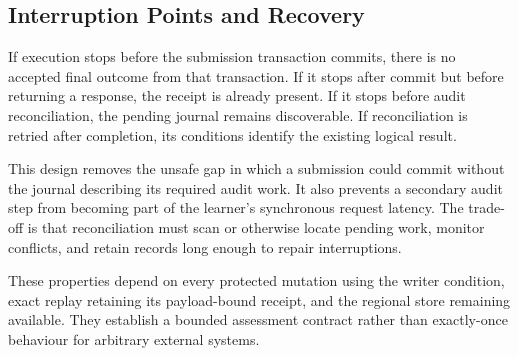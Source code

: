 \subsection{Interruption Points and Recovery}
If execution stops before the submission transaction commits, there is no accepted final outcome from that transaction. If it stops after commit but before returning a response, the receipt is already present. If it stops before audit reconciliation, the pending journal remains discoverable. If reconciliation is retried after completion, its conditions identify the existing logical result.

This design removes the unsafe gap in which a submission could commit without the journal describing its required audit work. It also prevents a secondary audit step from becoming part of the learner's synchronous request latency. The trade-off is that reconciliation must scan or otherwise locate pending work, monitor conflicts, and retain records long enough to repair interruptions.

These properties depend on every protected mutation using the writer condition, exact replay retaining its payload-bound receipt, and the regional store remaining available. They establish a bounded assessment contract rather than exactly-once behaviour for arbitrary external systems.
